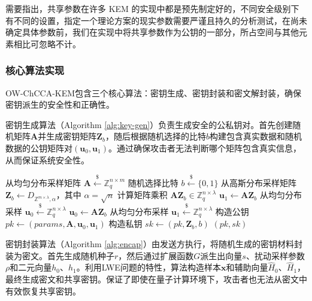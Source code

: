 需要指出，共享参数在许多 KEM 的实现中都是预先制定好的，不同安全级别下有不同的设置，指定一个理论方案的现实参数需要严谨且持久的分析测试，在尚未确定具体参数前，我们在实现中将共享参数作为公钥的一部分，所占空间与其他元素相比可忽略不计。

\subsubsection{核心算法实现}

OW-ChCCA-KEM包含三个核心算法：密钥生成、密钥封装和密文解封装，确保密钥派生的安全性和正确性。

密钥生成算法（Algorithm \ref{alg:key-gen}）负责生成安全的公私钥对。首先创建随机矩阵$\mathbf{A}$并生成密钥矩阵$\mathbf{Z}_b$，随后根据随机选择的比特$b$构建包含真实数据和随机数据的公钥矩阵对$(\mathbf{u}_0, \mathbf{u}_1)$。通过确保攻击者无法判断哪个矩阵包含真实信息，从而保证系统安全性。

\begin{algorithm}
\caption{OW-ChCCA-KEM密钥生成算法}
\label{alg:key-gen}
\begin{algorithmic}[1]
    \State 从均匀分布采样矩阵 $\mathbf{A} \stackrel{\$}{\leftarrow} \mathbb{Z}_q^{n \times m}$
    \State 随机选择比特 $b \stackrel{\$}{\leftarrow} \{0, 1\}$
    \State 从高斯分布采样矩阵 $\mathbf{Z}_b \leftarrow D_{\mathbb{Z}^{m \times \lambda}, \alpha}$，其中 $\alpha = \sqrt{n}$
    \State 计算矩阵乘积 $\mathbf{A}\mathbf{Z}_b \in \mathbb{Z}_q^{n \times \lambda}$
        \State $\mathbf{u}_1 \gets \mathbf{A}\mathbf{Z}_b$
        \State 从均匀分布采样 $\mathbf{u}_0 \stackrel{\$}{\leftarrow} \mathbb{Z}_q^{n \times \lambda}$
    \Else
        \State $\mathbf{u}_0 \gets \mathbf{A}\mathbf{Z}_b$
        \State 从均匀分布采样 $\mathbf{u}_1 \stackrel{\$}{\leftarrow} \mathbb{Z}_q^{n \times \lambda}$
    \EndIf
    \State 构造公钥 $pk \gets (params, \mathbf{A}, \mathbf{u}_0, \mathbf{u}_1)$
    \State 构造私钥 $sk \gets (pk, \mathbf{Z}_b, b)$
    \State \Return $(pk, sk)$
\EndProcedure
\end{algorithmic}
\end{algorithm}

密钥封装算法（Algorithm \ref{alg:encap}）由发送方执行，将随机生成的密钥材料封装为密文。首先生成随机种子$r$，然后通过扩展函数$G$派生出向量$s$、扰动采样参数$\rho$和二元向量$h_0$、$h_1$。利用LWE问题的特性，算法构造样本$\mathbf{x}$和辅助向量$\hat{H}_0$、$\hat{H}_1$，最终生成密文和共享密钥。保证了即使在量子计算环境下，攻击者也无法从密文中有效恢复共享密钥。

